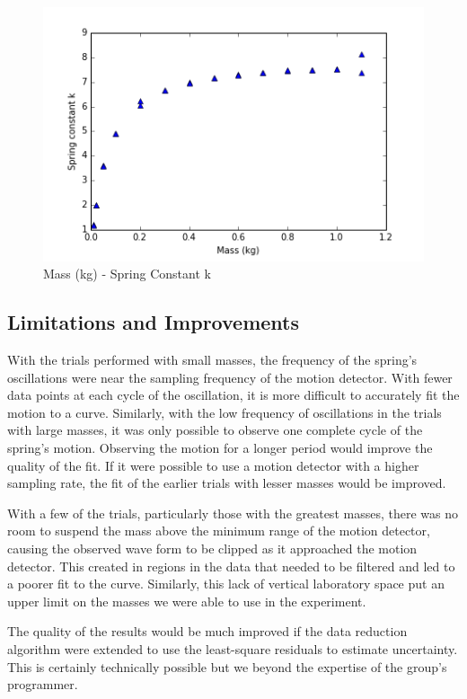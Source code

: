 \documentclass{article}
\numberwithin{figure}{section}
\numberwithin{table}{section}
\begin{document}
\begin{figure}[!hbp]
    \centering
    \includegraphics[width=\textwidth]{data/mass-v-k.png}
    \caption{Mass (kg) - Spring Constant k} 
    \label{mkplot}
\end{figure} 

\subsection{Limitations and Improvements} 

With the trials performed with small masses, the frequency of the spring's oscillations were near the sampling frequency of the motion detector.  With fewer data points at each cycle of the oscillation, it is more difficult to accurately fit the motion to a curve.  Similarly, with the low frequency of oscillations in the trials with large masses, it was only possible to observe one complete cycle of the spring's motion.  Observing the motion for a longer period would improve the quality of the fit.  If it were possible to use a motion detector with a higher sampling rate, the fit of the earlier trials with lesser masses would be improved. 

With a few of the trials, particularly those with the greatest masses, there was no room to suspend the mass above the minimum range of the motion detector, causing the observed wave form to be clipped as it approached the motion detector.  This created in regions in the data that needed to be filtered and led to a poorer fit to the curve.  Similarly, this lack of vertical laboratory space put an upper limit on the masses we were able to use in the experiment.

The quality of the results would be much improved if the data reduction algorithm were extended to use the least-square residuals to estimate uncertainty.  This is certainly technically possible but we beyond the expertise of the group's programmer.
\end{document}
